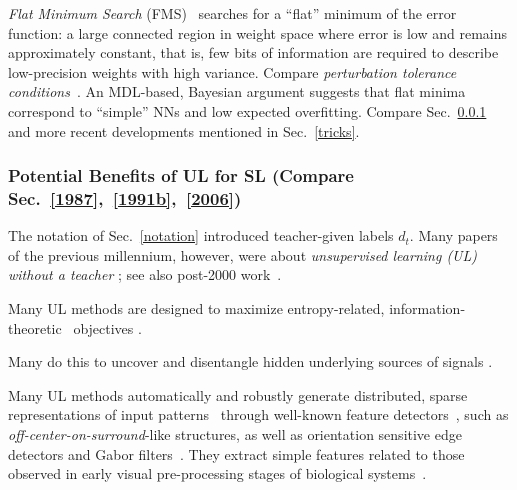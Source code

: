 \documentclass[letterpaper]{article}
\begin{document}
\begin{sloppypar}
{\em Flat Minimum Search} (FMS)~\citep{Hochreiter:97nc1,Hochreiter:99nc} searches 
for a ``flat'' minimum of the error function: 
a large connected region in weight space where error is low and remains 
approximately constant, that is, few bits of information are required to describe 
low-precision weights with high variance. Compare {\em perturbation tolerance conditions}~\citep{Minai:94,Murray:93,hanson1990,Neti:92,Matsuoka:92,Bishop:93,Kerlirzin:93,Carter:90}.
An MDL-based,  Bayesian 
argument suggests that flat minima correspond to 
``simple'' NNs and low 
expected overfitting. 
Compare Sec.~\ref{ulnn} and more recent developments mentioned in Sec.~\ref{tricks}.





\subsubsection{Potential Benefits of UL for SL (Compare Sec.~\ref{1987},~\ref{1991b},~\ref{2006})}
\label{ulnn}

 
The notation of Sec.~\ref{notation} introduced teacher-given labels $d_t$. 
Many papers of the previous millennium, however, were about 
 {\em unsupervised learning (UL) without a teacher} 
\citep[e.g.,][]{Hebb:49,malsburg1973,kohonen1972,Kohonen:82,Kohonen:88,WillshawMalsburg:76,Grossberg:76a,Grossberg:76b,Watanabe:85,PearlmutterHinton:86,Barrow:87,Field:87,Oja:89,Barlow:89,Baldi:89,Sanger:89,ritter1989,RubnerSchulten:90,Foldiak:90,Ritter:90,kosko1990,Mozer:91nips,Palm:92,Atick:92,Miller:94,Saund:94,Foldiak:95,DecoParra:97}; 
see also post-2000 work~\citep[e.g.,][]{carreira2001,WisSej2002,Franzius2007a,koch2008}. 

Many UL methods are designed to 
maximize entropy-related, 
information-theoretic~\citep{boltzmann1909,Shannon:48,kullback1951} objectives
\citep[e.g.,][]{Linsker:88,Barlow:89,MacKay:90,Plumbley:91,chunker91and92,Schmidhuber:92ncfactorial,Schraudolph:93,Redlich:93a,Zemel:93,Zemel:94nips,Field:94,hinton:95,Dayan:95a,Amari:96,DecoParra:97}.

Many do this to uncover and disentangle hidden underlying sources of signals 
\citep[e.g.,][]{Jutten:91,Schuster:92,andrade1993,Molgedey:94,Comon:94,Cardoso:94,Bell:95,karhunen1995,belouchrani1997,hyvarinen2001,szabo2006,shan2007,shan2014}.


Many UL methods automatically and robustly generate distributed, sparse 
representations of input 
patterns~\citep{Foldiak:90,Hinton:97,Lewicki:98b,Hyvarinen:99,Hochreiter:99nc,falconbridge2006}
through well-known feature 
detectors~\citep[e.g.,][]{Olshausen:96,Schmidhuber:96ncedges},
such as {\em off-center-on-surround}-like structures, 
as well as orientation sensitive edge detectors
and Gabor filters~\citep{gabor1946}.
They extract simple features related to those
observed in
early visual pre-processing stages of 
biological systems~\citep[e.g.,][]{valois1982,jones1987}. 


\end{sloppypar}
\end{document}
